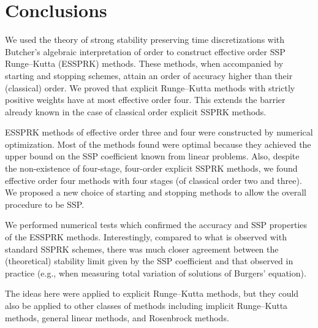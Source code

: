 \section{Conclusions}\label{sec:Conclusion}
We used the theory of strong stability preserving time discretizations
with Butcher's algebraic interpretation of order to construct
effective order SSP Runge--Kutta (ESSPRK) methods. 
These methods, when accompanied by starting and stopping
schemes, attain an order of accuracy higher than their (classical) order.
We proved that explicit Runge--Kutta methods with strictly positive 
weights have at most effective order four. 
This extends the barrier already known in the case of classical order
explicit SSPRK methods.

ESSPRK methods of effective order three and four
were constructed by numerical optimization.
Most of the methods found were optimal because they achieved
the upper bound on the SSP coefficient known from linear
problems.
Also, despite the non-existence of four-stage, four-order explicit SSPRK methods, 
we found effective order four methods with four stages (of classical 
order two and three). 
We proposed a new choice of starting and stopping methods to allow the
overall procedure to be SSP.

We performed numerical tests which confirmed the accuracy and
SSP properties of the ESSPRK methods.
Interestingly, compared to what is observed with standard SSPRK schemes,
there was much closer agreement between the (theoretical) stability limit
given by the SSP coefficient and that observed in practice
(e.g., when measuring total variation of solutions of Burgers' equation).

The ideas here were applied to explicit Runge--Kutta methods, but they
could also be applied to other classes of methods including implicit
Runge--Kutta methods, general linear methods, and Rosenbrock methods.
